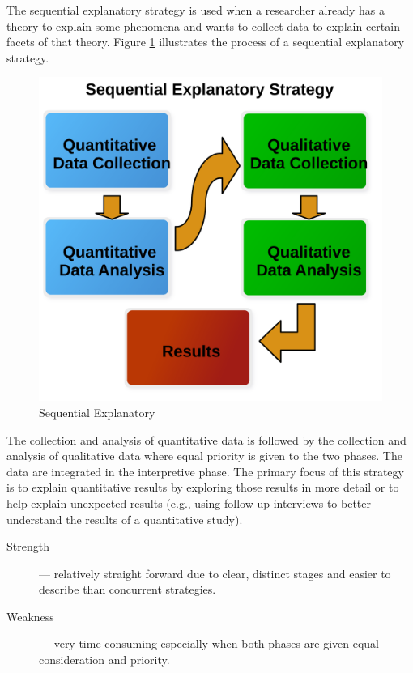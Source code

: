 The sequential explanatory strategy is used when a researcher already has a theory to explain some phenomena and wants to collect data to explain certain facets of that theory. Figure \ref{14:fig90} illustrates the process of a sequential explanatory strategy. 

\begin{figure}[H]
	\centering
	\includegraphics[width=\maxwidth{.95\linewidth}]{gfx/14-Seq_Explain}
	\caption{Sequential Explanatory}
	\label{14:fig90}
\end{figure}

The collection and analysis of quantitative data is followed by the collection and analysis of qualitative data where equal priority is given to the two phases. The data are integrated in the interpretive phase. The primary focus of this strategy is to explain quantitative results by exploring those results in more detail or to help explain unexpected results (e.g., using follow-up interviews to better understand the results of a quantitative study).

\begin{description}
	\item[Strength] --- relatively straight forward due to clear, distinct stages and easier to describe than concurrent strategies.

	\item[Weakness] --- very time consuming especially when both phases are given equal consideration and priority.
\end{description}

